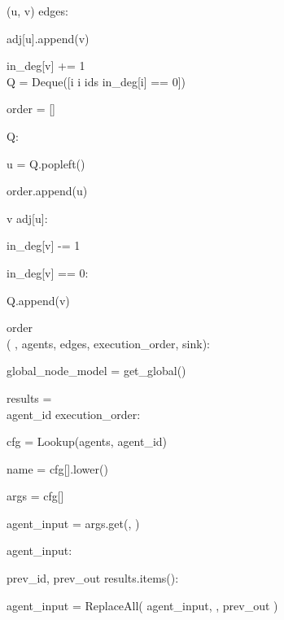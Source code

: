 \begin{subagent}[title=高 DoM 解析器]
\quad {} (u, v)  edges:

\quad\quad adj[u].append(v)

\quad\quad in\_deg[v] += 1 \\

\quad Q = Deque([i  i  ids  in\_deg[i] == 0])

\quad order = []

\quad {} Q:

\quad\quad u = Q.popleft()

\quad\quad order.append(u)

\quad\quad {} v  adj[u]:

\quad\quad\quad in\_deg[v] -= 1

\quad\quad\quad {} in\_deg[v] == 0:

\quad\quad\quad\quad Q.append(v)

\quad {} order \\



  (
, agents, edges, execution\_order, sink):

\quad global\_node\_model = get\_global()

\quad {}

\quad results = \code{\{\}} \\

\quad {} agent\_id  execution\_order:

\quad\quad cfg = Lookup(agents, agent\_id)

\quad\quad name = cfg[].lower()

\quad\quad args = cfg[]

\quad\quad agent\_input = args.get(, ) \\

\quad\quad {}

\quad\quad {} agent\_input:

\quad\quad\quad {} prev\_id, prev\_out  results.items():

\quad\quad\quad\quad agent\_input = ReplaceAll(
agent\_input,
,
prev\_out
) \\

\quad\quad {}


\end{subagent}
